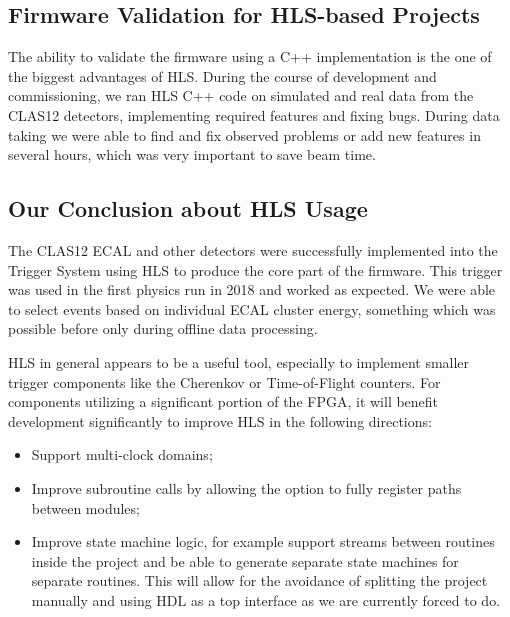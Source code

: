 \subsection{Firmware Validation for HLS-based Projects}

The ability to validate the firmware using a C++ implementation is the one of the biggest advantages of HLS. During the course of development and commissioning, we ran HLS C++ code on simulated and real data from the CLAS12 detectors, implementing required features and fixing bugs. During data taking we were able to find and fix observed problems or add new features in several hours, which was very important to save beam time.

\subsection{Our Conclusion about HLS Usage}

The CLAS12 ECAL and other detectors were successfully implemented into the Trigger System using HLS to produce the core part of the firmware. This trigger was used in the first physics run in 2018 and worked as expected. We were able to select events based on individual ECAL cluster energy, something which was possible before only during offline data processing.

HLS in general appears to be a useful tool, especially to implement smaller trigger components like the Cherenkov or Time-of-Flight counters. For components utilizing a significant portion of the FPGA, it will benefit development significantly to improve HLS in the following directions:

\begin{itemize}
	\item Support multi-clock domains;
	\item Improve subroutine calls by allowing the option to fully register paths between modules; 
	\item Improve state machine logic, for example support streams between routines inside the project and be able to generate separate state machines for separate routines. This will allow for the avoidance of splitting the project manually and using HDL as a top interface as we are currently forced to do.
\end{itemize}
